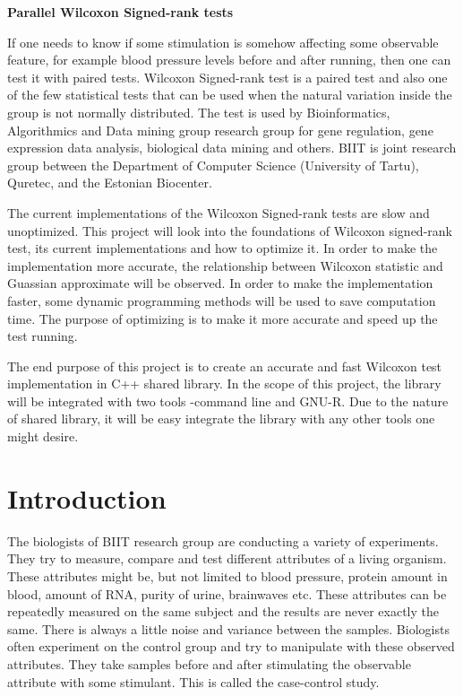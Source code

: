 \documentclass[12pt]{article}
\begin{document}
\noindent\textbf{\large Parallel Wilcoxon Signed-rank tests}
\vspace*{3ex}
{
If one needs to know if some stimulation is somehow affecting some observable feature, for example blood pressure levels before and after running, then one can test it with paired tests. Wilcoxon Signed-rank test is a paired test and also one of the few statistical tests that can be used when the natural variation inside the group is not normally distributed. The test is used by Bioinformatics, Algorithmics and Data mining group research group for gene regulation, gene expression data analysis, biological data mining and others. BIIT is joint research group between the Department of Computer Science (University of Tartu), Quretec, and the Estonian Biocenter.

The current implementations of the Wilcoxon Signed-rank tests are slow and unoptimized. This project will look into the foundations of Wilcoxon signed-rank test, its current implementations and how to optimize it. In order to make the implementation more accurate, the relationship between Wilcoxon statistic and Guassian approximate will be observed. In order to make the implementation faster, some dynamic programming methods will be used to save computation time. The purpose of optimizing is to make it more accurate and speed up the test running.

The end purpose of this project is to create an accurate and fast Wilcoxon test implementation in C++ shared library. In the scope of this project, the library will be integrated with two tools -command line and GNU-R. Due to the nature of shared library, it will be easy integrate the library with any other tools one might desire.

\vspace*{3ex}
{}



\newpage

\tableofcontents

\newpage

\section{Introduction}
The biologists of BIIT research group are conducting a variety of experiments. They try to measure, compare and test different attributes of a living organism. These attributes might be, but not limited to blood pressure, protein amount in blood, amount of RNA, purity of urine, brainwaves etc. These attributes can be repeatedly measured on the same subject and the results are never exactly the same. There is always a little noise and variance between the samples. Biologists often experiment on the control group and try to manipulate with these observed attributes. They take samples before and after stimulating the observable attribute with some stimulant. This is called the case-control study.

}
\end{document}
